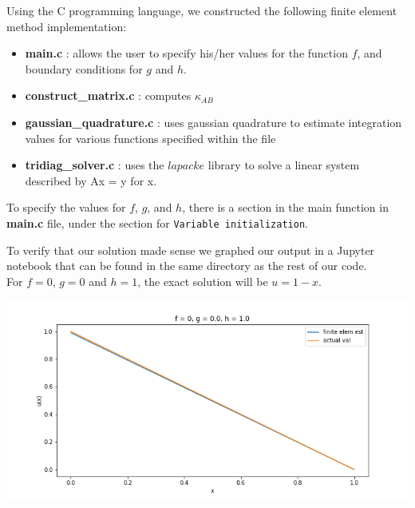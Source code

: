 \begin{solution}
Using the C programming language, we constructed the following finite element method implementation:

\begin{itemize}
\item[] \textbf{main.c} : allows the user to specify his/her values for the function $f$, and boundary conditions for $g$ and $h$.
\item[] \textbf{construct\_matrix.c} : computes $\kappa _{AB}$
\item[] \textbf{gaussian\_quadrature.c} : uses gaussian quadrature to estimate integration values for various functions specified within the file
\item[] \textbf{tridiag\_solver.c} : uses the $lapacke$ library to solve a linear system described by Ax = y for x. 
\end{itemize}

To specify the values for $f$, $g$, and $h$, there is a section in the main function in \textbf{main.c} file, under the section for \texttt{Variable initialization}.

To verify that our solution made sense we graphed our output in a Jupyter notebook that can be found in the same directory as the rest of our code.\\

For $f = 0$, $g = 0$ and $h = 1$, the exact solution will be $u = 1 - x$.

\begin{center}
    \includegraphics[scale=0.5]{DavidPineiro/f0_g0_h1.png}
\end{center}


\end{solution}
